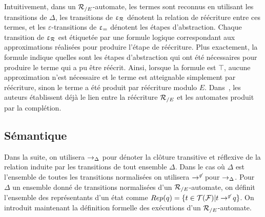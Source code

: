 Intuitivement, dans un ${\mathcal R_{/E}}$-automate, les termes sont reconnus en utilisant les transitions de $\Delta$, les transitions de $\upvarepsilon_{\mathcal R}$ dénotent la relation de réécriture
entre ces termes, et les $\varepsilon$-transitions de $\upvarepsilon_{=}$ dénotent
les étapes d'abstraction. Chaque transition de $\upvarepsilon_{\mathcal R}$ est étiquetée par une formule logique
correspondant aux approximations réalisées pour produire l'étape de réécriture. 
Plus exactement, la formule indique quelles sont les étapes d'abstraction qui ont été nécessaires 
pour produire le terme qui a pu être réécrit. 
Ainsi, lorsque la formule est $\top$, aucune approximation n'est nécessaire et le terme
est atteignable simplement par réécriture, sinon le terme a été produit par réécriture 
modulo $E$. Dans~\cite{GenetR-JSC10}, les auteurs établissent déjà le lien entre la réécriture ${\mathcal R_{/E}}$
et les automates produit par la complétion.




\subsection{Sémantique}







Dans la suite, on utilisera $\rightarrow_\Delta$ pour dénoter la clôture transitive et réflexive de 
la relation induite par les transitions de tout ensemble $\Delta$. 
Dans le cas où $\Delta$ est l'ensemble de toutes les transitions normalisées on utilisera $\rightarrow^{\not\varepsilon}$ 
pour $\rightarrow_\Delta$. 
Pour $\Delta$ un ensemble donné de transitions normalisées d'un ${\mathcal R_{/E}}$-automate, 
on définit l'ensemble des représentants d'un état comme $Rep(q) = \{ t \in \mathcal{T(F)} | t \rightarrow^{\not\varepsilon} q\}$. 
On introduit maintenant la définition formelle des exécutions d'un ${\mathcal R_{/E}}$-automate.

